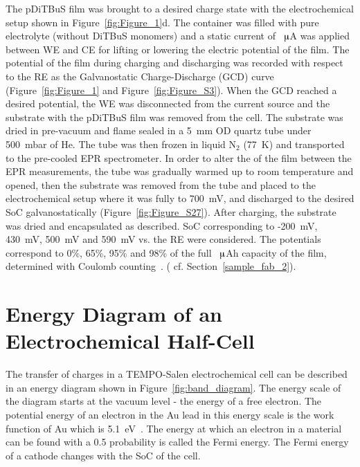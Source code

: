 The pDiTBuS film was brought to a desired charge state with the electrochemical setup shown in Figure~\ref{fig:Figure_1}d. The container was filled with pure electrolyte (without DiTBuS monomers) and a static current of ~$\muup$A was applied between WE and CE for lifting or lowering the electric potential of the film. The potential of the film during charging and discharging was recorded with respect to the RE as the Galvanostatic Charge-Discharge (GCD) curve (Figure~\ref{fig:Figure_1} and Figure~\ref{fig:Figure_S3}). When the GCD reached a desired potential, the WE was disconnected from the current source and the substrate with the pDiTBuS film was removed from the cell. The substrate was dried in pre-vacuum and flame sealed in a 5~mm OD quartz tube under 500~mbar of He. The tube was then  frozen in liquid N$_2$ (77~K) and transported to the pre-cooled EPR spectrometer. In order to alter the  of the film between the EPR measurements, the tube was gradually warmed up to room temperature and opened, then the substrate  was removed from the tube and placed to the electrochemical setup where it was fully  to 700~mV, and discharged to the  desired SoC galvanostatically (Figure~\ref{fig:Figure_S27}). After charging, the substrate was dried and encapsulated as described. SoC corresponding to -200~mV, 430~mV, 500~mV and 590~mV vs. the RE were considered. The potentials correspond to 0\%, 65\%, 95\% and 98\% of the full ~$\muup$Ah  capacity of the film, determined with Coulomb counting~\cite{Movassagh2021}. ( cf. Section~\ref{sample_fab_2}).\\

\section{Energy Diagram of an Electrochemical Half-Cell}
The transfer of charges in a TEMPO-Salen electrochemical cell can be described in an energy diagram shown in Figure~\ref{fig:band_diagram}. The energy scale of the diagram starts at the vacuum level - the energy of a free electron. The potential energy of an electron in the Au lead in this energy scale is the work function of Au which is 5.1~eV~\cite{Eastman1970}.  
The energy at which an electron in a material can be found with a 0.5 probability is called the Fermi energy.
The Fermi energy of a cathode changes with the SoC of the cell.


